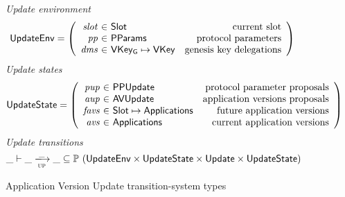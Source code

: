 \clearpage

\begin{figure}[htb]
  \emph{Update environment}
  \begin{equation*}
    \UpdateEnv =
    \left(
      \begin{array}{r@{~\in~}lr}
        \var{slot} & \Slot & \text{current slot}\\
        \var{pp} & \PParams & \text{protocol parameters}\\
        \var{dms} & \VKeyGen\mapsto\VKey & \text{genesis key delegations} \\
      \end{array}
    \right)
  \end{equation*}
  \emph{Update states}
  \begin{equation*}
    \UpdateState =
    \left(
      \begin{array}{r@{~\in~}lr}
        \var{pup} & \PPUpdate & \text{protocol parameter proposals} \\
        \var{aup} & \AVUpdate & \text{application versions proposals} \\
        \var{favs} & \Slot\mapsto\Applications & \text{future application versions} \\
        \var{avs} & \Applications & \text{current application versions} \\
      \end{array}
    \right)
  \end{equation*}
  \emph{Update transitions}
  \begin{equation*}
    \_ \vdash
    \var{\_} \trans{up}{\_} \var{\_}
    \subseteq \powerset (\UpdateEnv \times \UpdateState \times \Update \times \UpdateState)
  \end{equation*}
  \caption{Application Version Update transition-system types}
  \label{fig:ts-types:update}
\end{figure}

